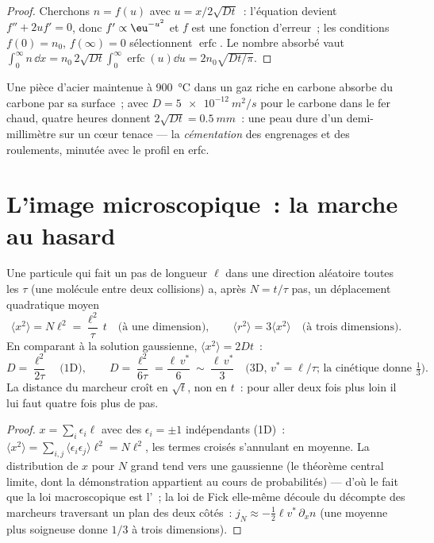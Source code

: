\begin{proof}
Cherchons $n = f(u)$ avec $u = x/2\sqrt{Dt}$~: l'équation devient
$f'' + 2uf' = 0$, donc $f' \propto \eu^{-u^2}$ et $f$ est une fonction
d'erreur~; les conditions $f(0) = n_0$, $f(\infty) = 0$ sélectionnent
$\operatorname{erfc}$. Le nombre absorbé vaut $\int_0^\infty n\,\dd x =
n_0\,2\sqrt{Dt}\int_0^\infty\operatorname{erfc}(u)\dd u = 2n_0\sqrt{Dt/\pi}$.
\end{proof}

\begin{example}\label{ex:b2:particle-diffusion:carburising}
Une pièce d'acier maintenue à \qty{900}{\celsius} dans un gaz riche en carbone absorbe
du carbone par sa surface~; avec $D = \qty{5e-12}{m^2/s}$ pour le carbone dans le fer
chaud, quatre heures donnent $2\sqrt{Dt} = \qty{0.5}{mm}$~: une peau dure d'un
demi-millimètre sur un cœur tenace --- la \emph{cémentation} des engrenages et des
roulements, minutée avec le profil en erfc.
\end{example}

\section{L'image microscopique~: la marche au hasard}\label{sec:b2:particle-diffusion:microscopic}

\begin{proposition}\label{prop:b2:particle-diffusion:walk}
Une particule qui fait un pas de longueur $\ell$ dans une direction aléatoire
toutes les $\tau$ (une molécule entre deux collisions) a, après $N =
t/\tau$ pas, un déplacement quadratique moyen
\[
\langle x^2\rangle = N\ell^2 = \frac{\ell^2}{\tau}\,t
\quad\text{(à une dimension)}, \qquad
\langle r^2\rangle = 3\langle x^2\rangle \quad\text{(à trois dimensions)}.
\]
En comparant à la solution gaussienne, $\langle x^2\rangle = 2Dt$~:
\[
D = \frac{\ell^2}{2\tau} \quad\text{(1D)}, \qquad
D = \frac{\ell^2}{6\tau} = \frac{\ell\,v^*}{6}\ \sim\ \frac{\ell\,v^*}{3}
\quad\text{(3D, } v^* = \ell/\tau\text{; la cinétique donne } \tfrac13) .
\]
La distance du marcheur croît en $\sqrt t$, non en $t$~: pour aller deux fois plus loin
il lui faut quatre fois plus de pas.
\end{proposition}

\begin{proof}
$x = \sum_i \epsilon_i\ell$ avec des $\epsilon_i = \pm1$ indépendants (1D)~:
$\langle x^2\rangle = \sum_{i,j}\langle\epsilon_i\epsilon_j\rangle\ell^2 =
N\ell^2$, les termes croisés s'annulant en moyenne. La distribution de $x$
pour $N$ grand tend vers une gaussienne (le théorème central limite, dont la
démonstration appartient au cours de probabilités) --- d'où le fait que la
loi macroscopique est l'~; la loi de Fick elle-même découle
du décompte des marcheurs traversant un plan des deux côtés~: $j_N \approx
-\tfrac12\ell v^*\,\partial_x n$ (une moyenne plus soigneuse donne $1/3$ à
trois dimensions).
\end{proof}

